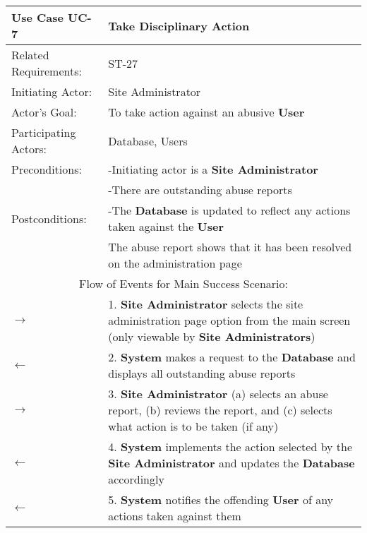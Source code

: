 \begin{centering}
\renewcommand\arraystretch{1.3} %
\label{UC-7}
\begin{longtable}{|p{1.2in} p{5in}|}
\hline
\bfseries{\color{color1}Use Case UC-7} & \bfseries{\color{color1}Take Disciplinary Action} \\
\hline
Related Requirements: & ST-27 \\ 
Initiating Actor:     & Site Administrator \\
Actor's Goal:         & To take action against an abusive \textbf{User} \\
Participating Actors:  & Database, Users \\
Preconditions:        & -Initiating actor is a \textbf{Site Administrator} \\
 & -There are outstanding abuse reports \\
Postconditions:       & -The \textbf{Database} is updated to reflect any actions taken against the \textbf{User} \\
 & The abuse report shows that it has been resolved on the administration page\\
\hline
\multicolumn{2}{|c|}{\color{color1}Flow of Events for Main Success Scenario:}\\
\hline
$\rightarrow$ & 1. \textbf{Site Administrator} selects the site administration page option from the main screen (only viewable by \textbf{Site Administrators}) \\
$\leftarrow$ & 2. \textbf{System} makes a request to the \textbf{Database} and displays all outstanding abuse reports\\
$\rightarrow$ & 3. \textbf{Site Administrator} (a) selects an abuse report, (b) reviews the report, and (c) selects what action is to be taken (if any)\\
$\leftarrow$ & 4. \textbf{System} implements the action selected by the \textbf{Site Administrator} and updates the \textbf{Database} accordingly \\
$\leftarrow$ & 5. \textbf{System} notifies the offending \textbf{User} of any actions taken against them \\
\hline
\end{longtable}
\end{centering}
